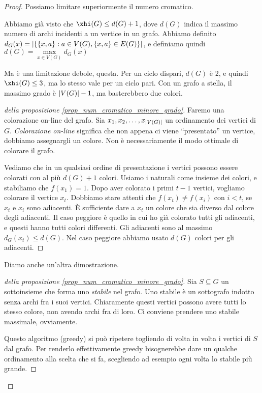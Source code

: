 \begin{proof}
	Possiamo limitare superiormente il numero cromatico.
	\begin{prop}
		\label{prop_num_cromatico_minore_grado}
		Abbiamo gi\`a visto che $\xhi(G) \le d(G) + 1$, dove $d(G)$ indica il massimo numero di archi incidenti a un vertice in un grafo.
		Abbiamo definito $d_G(x) = \left\lvert{\{ \{x,a\} : a \in V(G), \{x,a\} \in E(G) \}}\right\rvert$, e definiamo quindi $d(G) = \max\limits_{x \in V(G)} d_G(x)$
	\end{prop}
	Ma \`e una limitazione debole, questa.
	Per un ciclo dispari, $d(G)$ \`e 2, e quindi $\xhi(G) \le 3$, ma lo stesso vale per un ciclo pari.
	Con un grafo a stella, il massimo grado \`e $\left\lvert{V(G)}\right\rvert - 1$, ma basterebbero due colori.

	\begin{proof}[della proposizione \ref{prop_num_cromatico_minore_grado}]
		Faremo una colorazione on-line del grafo.
		Sia $x_1, x_2, \dots, x_{\left\lvert{V(G)}\right\rvert}$ un ordinamento dei vertici di $G$.
		\emph{Colorazione on-line} significa che non appena ci viene ``presentato'' un vertice, dobbiamo assegnargli un colore.
		Non \`e necessariamente il modo ottimale di colorare il grafo.

		Vediamo che in un qualsiasi ordine di presentazione i vertici possono essere colorati con al pi\`u $d(G) + 1$ colori.
		Usiamo i naturali come insieme dei colori, e stabiliamo che $f(x_1) = 1$.
		Dopo aver colorato i primi $t-1$ vertici, vogliamo colorare il vertice $x_t$.
		Dobbiamo stare attenti che $f(x_t) \neq f(x_i)$ con $i < t$, se $x_t$ e $x_i$ sono adiacenti.
		\`E sufficiente dare a $x_t$ un colore che sia diverso dal colore degli adiacenti.
		Il caso peggiore \`e quello in cui ho gi\`a colorato tutti gli adiacenti, e questi hanno tutti colori differenti.
		Gli adiacenti sono al massimo $d_G(x_t) \le d(G)$.
		Nel caso peggiore abbiamo usato $d(G)$ colori per gli adiacenti.
	\end{proof}

	Diamo anche un'altra dimostrazione.
	\begin{proof}[della proposizione \ref{prop_num_cromatico_minore_grado}]
		Sia $S \subseteq G$ un sottoinsieme che forma uno \emph{stabile} nel grafo.
		Uno stabile \`e un sottografo indotto senza archi fra i suoi vertici.
		Chiaramente questi vertici possono avere tutti lo stesso colore, non avendo archi fra di loro.
		Ci conviene prendere uno stabile massimale, ovviamente.

		Questo algoritmo (greedy) si pu\`o ripetere togliendo di volta in volta i vertici di $S$ dal grafo.
		Per renderlo effettivamente greedy bisognerebbe dare un qualche ordinamento alla scelta che si fa, scegliendo ad esempio ogni volta lo stabile pi\`u grande.


\end{proof}
\end{proof}
